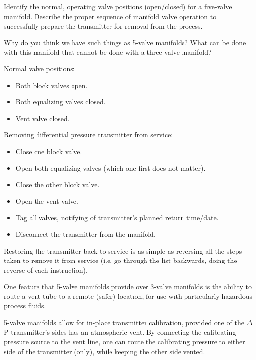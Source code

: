 Identify the normal, operating valve positions (open/closed) for a five-valve manifold.  Describe the proper sequence of manifold valve operation to successfully prepare the transmitter for removal from the process.

\vskip 10pt

Why do you think we have such things as 5-valve manifolds?  What can be done with this manifold that cannot be done with a three-valve manifold?







Normal valve positions:

\begin{itemize}
\item{} Both block valves open.
\item{} Both equalizing valves closed.
\item{} Vent valve closed.
\end{itemize}

\vskip 10pt

Removing differential pressure transmitter from service:

\begin{itemize}
\item{} Close one block valve.
\item{} Open both equalizing valves (which one first does not matter).
\item{} Close the other block valve.
\item{} Open the vent valve.
\item{} Tag all valves, notifying of transmitter's planned return time/date.
\item{} Disconnect the transmitter from the manifold.
\end{itemize}

\vskip 10pt

Restoring the transmitter back to service is as simple as reversing all the steps taken to remove it from service (i.e. go through the list backwards, doing the reverse of each instruction).

One feature that 5-valve manifolds provide over 3-valve manifolds is the ability to route a vent tube to a remote (safer) location, for use with particularly hazardous process fluids.

5-valve manifolds allow for in-place transmitter calibration, provided one of the $\Delta$P transmitter's sides has an atmospheric vent.  By connecting the calibrating pressure source to the vent line, one can route the calibrating pressure to either side of the transmitter (only), while keeping the other side vented.











